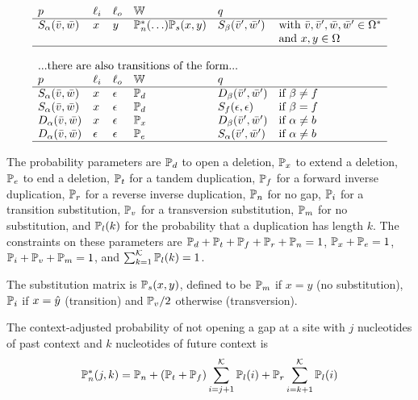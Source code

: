\documentclass[english]{article}
\begin{document}
\[\begin{array}{llllll}
{  } \\
\src & \inlab & \outlab & \weight & \dest \\
\hline
%
\symstate{\srcblock}(\seqpast,\seqnext) & \sym & \outsym & \pcont(\ldots) \psub & \symstate{\destblock}(\seqpast',\seqnext') & \text{with $\seqpast,\seqpast',\seqnext,\seqnext' \in \kleene{\outalph}$} \\
  & & & & & \text{and $\sym,\outsym \in \outalph$} \\
\hline
%
\\
  \multicolumn{6}{l}{
    \text{...there are also transitions of the form...}
  } \\
\src & \inlab & \outlab & \weight & \dest \\
\hline
\symstate{\srcblock}(\seqpast,\seqnext) & \sym & \emptystring & \pdelopen & \delstate{\destblock}(\seqpast',\seqnext') & \text{if $\destblock \neq f$} \\
\symstate{\srcblock}(\seqpast,\seqnext) & \sym & \emptystring & \pdelopen & \symstate{f}(\emptystring,\emptystring) & \text{if $\destblock = f$} \\
\delstate{\srcblock}(\seqpast,\seqnext) & \sym & \emptystring & \pdelext & \delstate{\destblock}(\seqpast',\seqnext') & \text{if $\srcblock \neq b$} \\
\delstate{\srcblock}(\seqpast,\seqnext) & \emptystring & \emptystring & \pdelend & \symstate{\srcblock}(\seqpast',\seqnext') & \text{if $\srcblock \neq b$} \\
\hline
\end{array}
\]

The probability parameters are
$\mathbb{P}_{d}$ to open a deletion,
$\mathbb{P}_{x}$ to extend a deletion,
$\mathbb{P}_{e}$ to end a deletion,
$\mathbb{P}_{t}$ for a tandem duplication,
$\mathbb{P}_{f}$ for a forward inverse duplication,
$\mathbb{P}_{r}$ for a reverse inverse duplication,
$\mathbb{P}_{n}$ for no gap,
$\mathbb{P}_{i}$ for a transition substitution,
$\mathbb{P}_{v}$ for a transversion substitution,
$\mathbb{P}_{m}$ for no substitution, and
$\mathbb{P}_{l}(k)$ for the probability that a duplication has length $k$.
The constraints on these parameters are
$\mathbb{P}_{d}+\mathbb{P}_{t}+\mathbb{P}_{f}+\mathbb{P}_{r}+\mathbb{P}_{n}=1$,
$\mathbb{P}_{x}+\mathbb{P}_{e}=1$,
$\mathbb{P}_{i}+\mathbb{P}_{v}+\mathbb{P}_{m}=1$,
and
$\sum_{k=1}^{{\cal K}} \mathbb{P}_{l}(k) = 1$.

The substitution matrix is $\mathbb{P}_{s}(x,y)$, defined to be $\mathbb{P}_{m}$ if $x=y$ (no substitution), $\mathbb{P}_{i}$ if $x = \hat{y}$ (transition)
and $\mathbb{P}_{v}/2$ otherwise (transversion).

The context-adjusted probability of not opening a gap at a site with $j$ nucleotides of past context and $k$ nucleotides of future context is
\[
\mathbb{P}_{n}^\ast(j,k) = \mathbb{P}_{n} + (\mathbb{P}_{t} + \mathbb{P}_{f}) \sum_{i=j+1}^{{\cal K}} \mathbb{P}_{l}(i) + \mathbb{P}_{r} \sum_{i=k+1}^{{\cal K}} \mathbb{P}_{l}(i)
\]
\end{document}
